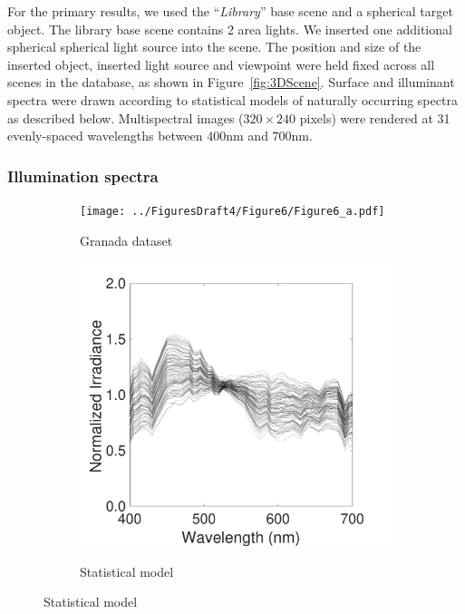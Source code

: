 \documentclass{jov}
\begin{document}
For the primary results, we used the ``{\it Library}'' base scene and a spherical target object.
The library base scene contains 2 area lights. 
We inserted one additional spherical spherical light source into the scene.
The position and size of the inserted object, inserted light source and viewpoint were held fixed across all 
scenes in the database, as shown in Figure~\ref{fig:3DScene}.
Surface and illuminant spectra were drawn according to statistical models of naturally occurring spectra as described below.
Multispectral images ($320 \times 240$ pixels) were rendered at 31 evenly-spaced wavelengths between $400$nm and $700$nm.
\subsubsection{Illumination spectra}
\begin{figure}
\centering
    \begin{subfigure}[b]{0.24 \textwidth}
    \centering
	\caption{Granada dataset}
        \texttt{[image: ../FiguresDraft4/Figure6/Figure6\_a.pdf]}
        \label{fig:granadaData}
    \end{subfigure}
	\begin{subfigure}[b]{0.24 \textwidth}
    \centering
        \caption{Statistical model}
        \includegraphics[width=\textwidth]{../FiguresDraft4/Figure6/Figure6_b.pdf}
        \label{fig:illuminantSamples}
    \end{subfigure}

\end{figure}
\end{document}
